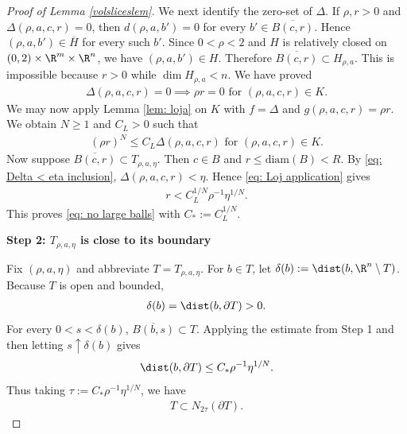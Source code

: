\documentclass{article}
\numberwithin{equation}{section}
\theoremstyle{plain}
\begin{document}
\begin{proof}[Proof of Lemma \ref{volsliceslem}]
    We next identify the zero-set of $\Delta$. If $\rho, r>0$ and $\Delta(\rho,a,c,r)=0$, then $d(\rho,a,b') =0$ for every $b' \in \overline{B(c,r)}$. Hence $(\rho,a,b') \in \overline H$ for every such $b'$. Since $0 < \rho < 2$ and $H$ is relatively closed on $(0,2) \times \R^m \times \R^n$, we have $(\rho,a,b') \in H$. Therefore $\overline{B(c,r)} \subset H_{\rho,a}$. This is impossible because $r > 0$ while $\dim H_{\rho,a} < n$. We have proved 
    \begin{align}
        \Delta(\rho,a,c,r) = 0 \implies \rho r = 0 \text{ for $(\rho,a,c,r) \in K$}.
    \end{align}
    We may now apply Lemma \ref{lem: loja} on $K$ with $f = \Delta$ and $g(\rho,a,c,r) = \rho r$. We obtain $N \geq 1$ and $C_L > 0$ such that 
    \begin{align}
        (\rho r)^N \leq C_L \Delta(\rho,a,c,r) \text{ for $(\rho,a,c,r) \in K$}.\label{eq: Loj application}
    \end{align}
    Now suppose $\overline{B(c,r)} \subset T_{\rho,a,\eta}$. Then  $c \in B$ and $r \leq \mathrm{diam}(B) < R$. By \eqref{eq: Delta < eta inclusion}, $\Delta(\rho,a,c,r) < \eta$. Hence \eqref{eq: Loj application} gives 
    \begin{align}
        r < C_{L}^{1/N} \rho^{-1} \eta^{1/N}.
    \end{align}
    This proves \eqref{eq: no large balls} with $C_* := C_L^{1/N}$.

    \medskip

    \noindent \textbf{Step 2: $T_{\rho,a,\eta}$ is close to its boundary}

    Fix $(\rho,a,\eta)$ and abbreviate $T = T_{\rho,a,\eta}$.
    For $b \in T$, let $\delta(b) := \dist(b, \R^n \setminus T)$. Because $T$ is open and bounded, 
    \begin{align}
        \delta(b) = \dist(b,\partial T) > 0. 
    \end{align}
    For every $0 < s < \delta(b)$, $\overline{B(b,s)} \subset T$. Applying the estimate from Step 1 and then letting $s \uparrow \delta(b)$ gives 
    \begin{align}
        \dist(b,\partial T) \leq C_* \rho^{-1} \eta^{1/N}.
    \end{align}
    Thus taking $\tau :=C_* \rho^{-1} \eta^{1/N}$, we have 
    \begin{align}
        T \subset N_{2\tau}(\partial T). \label{eq: near boundary}
    \end{align}


\end{proof}
\end{document}
